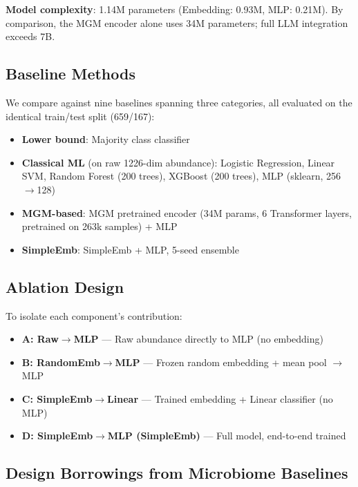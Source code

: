 \documentclass[11pt,a4paper]{article}
\begin{document}
\textbf{Model complexity}: 1.14M parameters (Embedding: 0.93M, MLP: 0.21M). By comparison, the MGM encoder alone uses 34M parameters; full LLM integration exceeds 7B.

\subsection{Baseline Methods}

We compare against nine baselines spanning three categories, all evaluated on the identical train/test split (659/167):

\begin{itemize}
  \item \textbf{Lower bound}: Majority class classifier
  \item \textbf{Classical ML} (on raw 1226-dim abundance): Logistic Regression, Linear SVM, Random Forest (200 trees), XGBoost (200 trees), MLP (sklearn, 256$\rightarrow$128)
  \item \textbf{MGM-based}: MGM pretrained encoder (34M params, 6 Transformer layers, pretrained on 263k samples) + MLP
  \item \textbf{SimpleEmb}: SimpleEmb + MLP, 5-seed ensemble
\end{itemize}

\subsection{Ablation Design}

To isolate each component's contribution:
\begin{itemize}
  \item \textbf{A: Raw$\rightarrow$MLP} --- Raw abundance directly to MLP (no embedding)
  \item \textbf{B: RandomEmb$\rightarrow$MLP} --- Frozen random embedding + mean pool $\rightarrow$ MLP
  \item \textbf{C: SimpleEmb$\rightarrow$Linear} --- Trained embedding + Linear classifier (no MLP)
  \item \textbf{D: SimpleEmb$\rightarrow$MLP (SimpleEmb)} --- Full model, end-to-end trained
\end{itemize}

\subsection{Design Borrowings from Microbiome Baselines}
\end{document}

